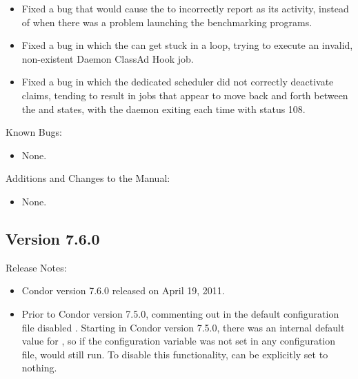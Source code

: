 \begin{itemize}
\item Fixed a bug that would cause the  to 
incorrectly report  as its activity, instead of 
when there was a problem launching the benchmarking programs. 

\item Fixed a bug in which the  can get stuck in a loop,
trying to execute an invalid, non-existent Daemon ClassAd Hook job. 

\item Fixed a bug in which the dedicated scheduler did not correctly 
deactivate claims,
tending to result in jobs that appear to move back and forth between
the  and  states,
with the  daemon exiting each time with status 108.

\end{itemize}

\noindent Known Bugs:

\begin{itemize}

\item None.

\end{itemize}

\noindent Additions and Changes to the Manual:

\begin{itemize}

\item None.

\end{itemize}


\subsection*{\label{sec:New-7-6-0}Version 7.6.0}

\noindent Release Notes:

\begin{itemize}

\item Condor version 7.6.0 released on April 19, 2011.

\item Prior to Condor version 7.5.0, commenting out  in the
  default configuration file disabled .  
  Starting in Condor version 7.5.0,
  there was an internal default value for , so if
  the configuration variable was not set in any configuration file,
   would still run.
  To disable this functionality,  can be explicitly set to
  nothing.

\end{itemize}


